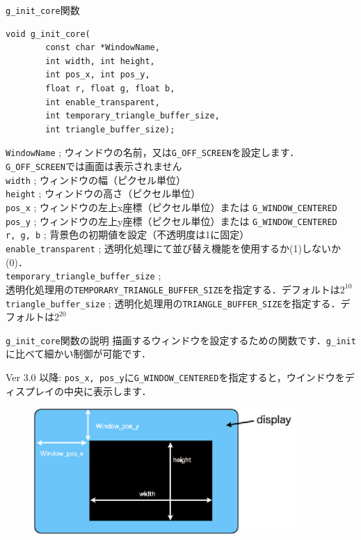 \documentclass[platex,a4paper,12pt]{jsarticle}%
\begin{document}
\begin{itembox}[l]{\texttt{g\_init\_core}関数}
\begin{verbatim}
void g_init_core(
        const char *WindowName,
        int width, int height,
        int pos_x, int pos_y,
        float r, float g, float b,
        int enable_transparent,
        int temporary_triangle_buffer_size, 
        int triangle_buffer_size);
\end{verbatim}
\verb|WindowName| ; ウィンドウの名前，又は\verb|G_OFF_SCREEN|を設定します．\verb|G_OFF_SCREEN|では画面は表示されません\\
\verb|width| ; ウィンドウの幅（ピクセル単位）\\
\verb|height| ; ウィンドウの高さ（ピクセル単位）\\
\verb|pos_x| ; ウィンドウの左上x座標（ピクセル単位）または \verb|G_WINDOW_CENTERED|\\
\verb|pos_y| ; ウィンドウの左上y座標（ピクセル単位）または \verb|G_WINDOW_CENTERED|\\
\verb|r, g, b| ; 背景色の初期値を設定（不透明度は1に固定）\\
\verb|enable_transparent| ; 透明化処理にて並び替え機能を使用するか(1)しないか(0)．\\
\verb|temporary_triangle_buffer_size| ;\\ 透明化処理用の\verb|TEMPORARY_TRIANGLE_BUFFER_SIZE|を指定する．デフォルトは$2^{10}$\\
\verb|triangle_buffer_size| ; 透明化処理用の\verb|TRIANGLE_BUFFER_SIZE|を指定する．デフォルトは$2^{20}$
\end{itembox}

\begin{itembox}[l]{\texttt{g\_init\_core}関数の説明}
描画するウィンドウを設定するための関数です．\texttt{g\_init}に比べて細かい制御が可能です．

Ver 3.0 以降: \verb|pos_x, pos_y|に\verb|G_WINDOW_CENTERED|を指定すると，ウインドウをディスプレイの中央に表示します．
\end{itembox}

\begin{figure}[htb]
\centering
\includegraphics[width=100mm]{Canvas_g_init_core.eps}
\end{figure}
\end{document}
